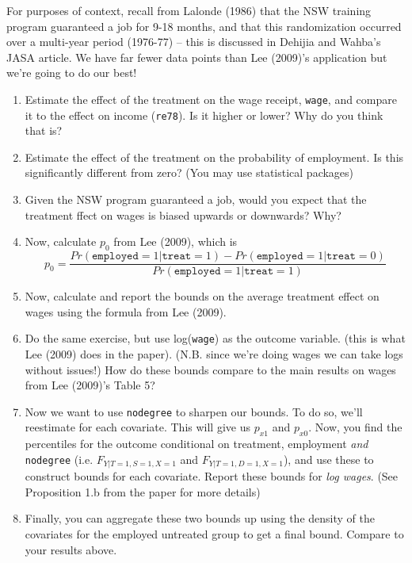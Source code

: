 \documentclass[11pt, a4paper]{article}
\begin{document}
\begin{enumerate}
For purposes of context, recall from Lalonde (1986) that the NSW training program guaranteed a job for 9-18 months, and that this randomization occurred over a multi-year period (1976-77) -- this is discussed in Dehijia and Wahba's JASA article. We have far fewer data points than Lee (2009)'s application but we're going to do our best!
\begin{enumerate}
    \item Estimate the effect of the treatment on the wage receipt, \texttt{wage}, and compare it to the effect on income (\texttt{re78}). Is it higher or lower? Why do you think that is? 
    \item Estimate the effect of the treatment on the probability of employment. Is this significantly different from zero? (You may use statistical packages) 
    \item Given the NSW program guaranteed a job, would you expect that the treatment ffect on wages is biased upwards or downwards? Why?
    \item Now, calculate $p_{0}$ from Lee (2009), which is 
    \begin{equation}
        \label{eq:lee_p}
        p_{0} = \frac{Pr(\texttt{employed} = 1 | \texttt{treat} = 1) - Pr(\texttt{employed} = 1 | \texttt{treat} = 0)}{Pr(\texttt{employed} = 1 | \texttt{treat} = 1)}
    \end{equation}
    \item Now, calculate and report the bounds on the average treatment effect on wages using the formula from Lee (2009). 
    \item Do the same exercise, but use log(\texttt{wage}) as the outcome variable. (this is what Lee (2009) does in the paper). (N.B. since we're doing wages we can take logs without issues!) How do these bounds compare to the main results on wages from Lee (2009)'s Table 5? 
    \item Now we want to use \texttt{nodegree} to sharpen our bounds. To do so, we'll reestimate  for each covariate. This will give us $p_{x1}$ and $p_{x0}$. Now, you find the percentiles for the outcome conditional on treatment, employment \emph{and} \texttt{nodegree} (i.e. $F_{Y|T=1, S = 1, X=1}$ and $F_{Y|T=1, D=1, X = 1}$), and use these to construct bounds for each covariate. Report these bounds for \emph{log wages}. (See Proposition 1.b from the paper for more details)
    \item Finally, you can aggregate these two bounds up using the density of the covariates for the employed untreated group to get a final bound. Compare to your results above. 
\end{enumerate}
\end{enumerate}
\end{document}
